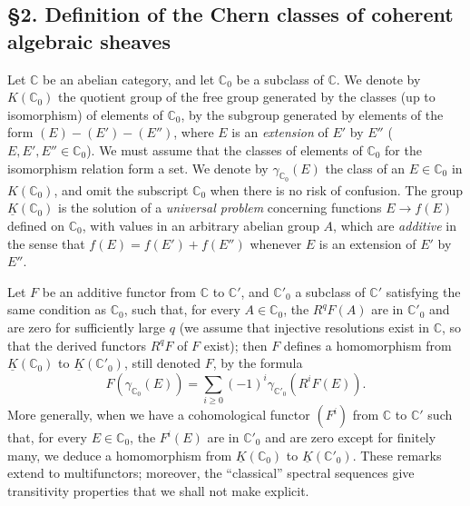 \subsection*{\S 2. Definition of the Chern classes of coherent algebraic sheaves}

Let $\mathbb{C}$ be an abelian category, and let $\mathbb{C}_0$ be a subclass of $\mathbb{C}$. We denote by $K(\mathbb{C}_0)$ the quotient group of the free group generated by the classes (up to isomorphism) of elements of $\mathbb{C}_0$, by the subgroup generated by elements of the form $(E)-(E')-(E'')$, where $E$ is an \emph{extension} of $E'$ by $E''$ ($E,E',E''\in\mathbb{C}_0$). We must assume that the classes of elements of $\mathbb{C}_0$ for the isomorphism relation form a set. We denote by $\gamma_{\mathbb{C}_0}(E)$ the class of an $E\in\mathbb{C}_0$ in $K(\mathbb{C}_0)$, and omit the subscript $\mathbb{C}_0$ when there is no risk of confusion. The group $\underline{K}(\mathbb{C}_0)$ is the solution of a \emph{universal problem} concerning functions $E\longrightarrow f(E)$ defined on $\mathbb{C}_0$, with values in an arbitrary abelian group $A$, which are \emph{additive} in the sense that $f(E)=f(E')+f(E'')$ whenever $E$ is an extension of $E'$ by $E''$.

Let $F$ be an additive functor from $\mathbb{C}$ to $\mathbb{C}'$, and $\mathbb{C}'_0$ a subclass of $\mathbb{C}'$ satisfying the same condition as $\mathbb{C}_0$, such that, for every $A\in\mathbb{C}_0$, the $R^qF(A)$ are in $\mathbb{C}'_0$ and are zero for sufficiently large $q$ (we assume that injective resolutions exist in $\mathbb{C}$, so that the derived functors $R^qF$ of $F$ exist); then $F$ defines a homomorphism from $\underline{K}(\mathbb{C}_0)$ to $\underline{K}(\mathbb{C}'_0)$, still denoted $F$, by the formula
\begin{equation}\tag{2.11}
 F(\gamma_{\mathbb{C}_0}(E))=\sum_{i\geq 0}(-1)^i\gamma_{\mathbb{C}'_0}(R^iF(E)).
\end{equation}
More generally, when we have a cohomological functor $(F^i)$ from $\mathbb{C}$ to $\mathbb{C}'$
%
such that,
for every $E\in\mathbb{C}_0$, the $F^i(E)$ are in $\mathbb{C}'_0$ and are zero except for finitely many, we deduce a homomorphism from $\underline{K}(\mathbb{C}_0)$ to $\underline{K}(\mathbb{C}'_0)$. These remarks extend to multifunctors; moreover, the ``classical'' spectral sequences give transitivity properties that we shall not make explicit.

